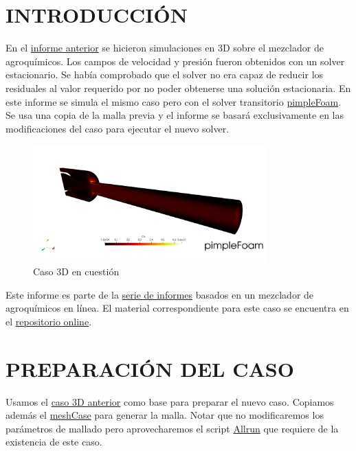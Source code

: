 \documentclass[oneside,a4paper,spanish,links]{amca}
\begin{document}
\section{INTRODUCCIÓN}
En el \href{https://github.com/guillerolle/informes_cfd/blob/master/Informe03.pdf}{informe anterior} se hicieron simulaciones en 3D sobre el mezclador de agroquímicos. Los campos de velocidad y presión fueron obtenidos con un solver estacionario. Se había comprobado que el solver no era capaz de reducir los residuales al valor requerido por no poder obtenerse una solución estacionaria. En este informe se simula el mismo caso pero con el solver transitorio \href{https://www.openfoam.com/documentation/guides/latest/doc/guide-applications-solvers-incompressible-pimpleFoam.html}{pimpleFoam}. Se usa una copia de la malla previa y el informe se basará exclusivamente en las modificaciones del caso para ejecutar el nuevo solver. 

\begin{figure}[htb]
	\centerline{\includegraphics[width=0.8\textwidth]{Figuras/00_Intro.png}} 
	\caption{Caso 3D en cuestión} \label{fg:intro}
\end{figure}

Este informe es parte de la \href{https://github.com/guillerolle/informes_cfd}{serie de informes} basados en un mezclador de agroquímicos en línea. El material correspondiente para este caso se encuentra en el \href{https://github.com/guillerolle/casos_cfd}{repositorio online}.

\section{PREPARACIÓN DEL CASO}
Usamos el \href{https://github.com/guillerolle/casos_cfd/tree/master/03/case}{caso 3D anterior} como base para preparar el nuevo caso. Copiamos además el \href{https://github.com/guillerolle/casos_cfd/tree/master/03/meshCase}{meshCase} para generar la malla. Notar que no modificaremos los parámetros de mallado pero aprovecharemos el script \href{https://github.com/guillerolle/casos_cfd/tree/master/03/case/Allrun}{Allrun} que requiere de la existencia de este caso.
\end{document}

